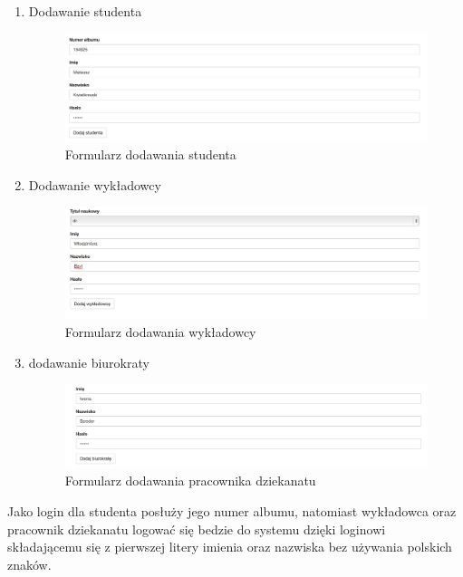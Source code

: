 \documentclass{xmgr}
\begin{document}
\begin{enumerate}
\item Dodawanie studenta

\begin{figure}[H]
\centering
\includegraphics[width=1.1\hsize]{images/addNewStudent}
\caption{Formularz dodawania studenta\label{RYS.7}}
\end{figure}

\item Dodawanie wykładowcy

\begin{figure}[th!]
\centering
\includegraphics[width=0.9\hsize]{images/addTeacher}
\caption{Formularz dodawania wykładowcy\label{RYS.8}}
\end{figure}
\newpage
\item dodawanie biurokraty

\begin{figure}[th!]
\centering
\includegraphics[width=0.7\hsize]{images/addBiurokrata}
\caption{Formularz dodawania pracownika dziekanatu\label{RYS.9}}
\end{figure}

\end{enumerate}

\noindent Jako login dla studenta posłuży jego numer albumu, natomiast wykładowca oraz pracownik dziekanatu logować się bedzie do systemu  dzięki loginowi składającemu się z pierwszej litery imienia oraz nazwiska bez używania polskich znaków.
\end{document}
